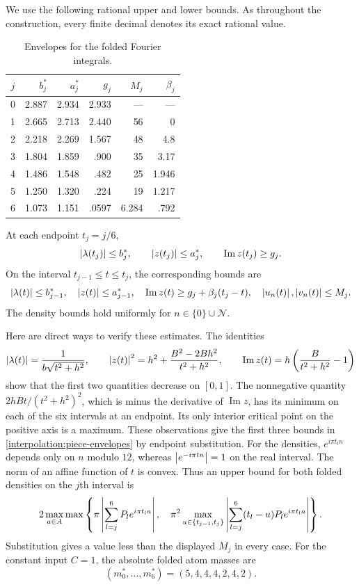 We use the following rational upper and lower bounds.  As throughout the
construction, every finite decimal denotes its exact rational value.
\begin{table}[htbp]
\centering
\begin{tabular}{c|rrr|rr}
$j$ & $b_j^*$ & $a_j^*$ & $g_j$ & $M_j$ & $\beta_j$\\ \hline
0 & 2.887 & 2.934 & 2.933 & --- & ---\\
1 & 2.665 & 2.713 & 2.440 & 56 & 0\\
2 & 2.218 & 2.269 & 1.567 & 48 & 4.8\\
3 & 1.804 & 1.859 & .900 & 35 & 3.17\\
4 & 1.486 & 1.548 & .482 & 25 & 1.946\\
5 & 1.250 & 1.320 & .224 & 19 & 1.217\\
6 & 1.073 & 1.151 & .0597 & 6.284 & .792
\end{tabular}
\caption{Envelopes for the folded Fourier integrals.}
\label{interpolation:envelopes}
\end{table}

At each endpoint $t_j=j/6$,
\[
 \left\lvert\lambda(t_j)\right\rvert\le b_j^*,\qquad
 \left\lvert z(t_j)\right\rvert\le a_j^*,\qquad
 \operatorname{Im}z(t_j)\ge g_j.
\]
On the interval $t_{j-1}\le t\le t_j$, the corresponding bounds are
\begin{equation}\label{interpolation:piece-envelopes}
 \left\lvert\lambda(t)\right\rvert\le b_{j-1}^*,\quad
 \left\lvert z(t)\right\rvert\le a_{j-1}^*,\quad
 \operatorname{Im}z(t)\ge g_j+\beta_j(t_j-t),\quad
 \left\lvert u_n(t)\right\rvert,\left\lvert v_n(t)\right\rvert\le M_j.
\end{equation}
The density bounds hold uniformly for
$n\in\{0\}\cup\mathcal N$.

Here are direct ways to verify these estimates.  The identities
\[
 \left\lvert\lambda(t)\right\rvert=\frac{1}{b\sqrt{t^2+h^2}},\qquad
 \left\lvert z(t)\right\rvert^2=h^2+\frac{B^2-2Bh^2}{t^2+h^2},\qquad
 \operatorname{Im}z(t)=h\left(\frac{B}{t^2+h^2}-1\right)
\]
show that the first two quantities decrease on $[0,1]$.  The nonnegative
quantity $2hBt/(t^2+h^2)^2$, which is minus the derivative of
$\operatorname{Im}z$, has its minimum on each of the six intervals at an
endpoint.  Its only interior critical point on the positive axis is a
maximum.  These observations give the first three bounds in
\eqref{interpolation:piece-envelopes} by endpoint substitution.
For the densities, $e^{i\pi t_l n}$ depends only on $n$ modulo $12$,
whereas $\left\lvert e^{-i\pi tn}\right\rvert=1$ on the real interval.  The norm of an
affine function of $t$ is convex.  Thus an upper bound for both folded
densities on the $j$th interval is
\begin{equation}\label{interpolation:density-check}
 2\max_{a\in A}\max\left\{
 \pi\left\lvert\sum_{l=j}^6P_le^{i\pi t_la}\right\rvert,\quad
 \pi^2\max_{u\in\{t_{j-1},t_j\}}
       \left\lvert\sum_{l=j}^6(t_l-u)P_le^{i\pi t_la}\right\rvert
 \right\}.
\end{equation}
Substitution gives a value less than the displayed $M_j$ in every case.
For the constant input $C=1$, the absolute folded atom masses are
\[
 (m_0^*,\ldots,m_6^*)=(5,4,4,4,2,4,2).
\]

